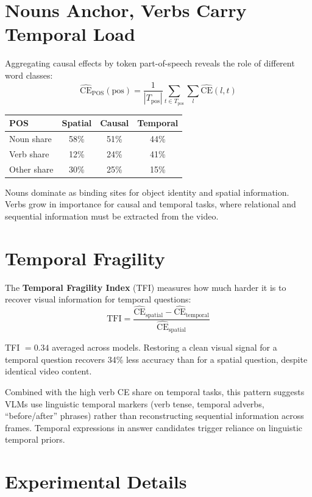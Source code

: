 \documentclass[10pt,twocolumn]{article}
\begin{document}
\section{Nouns Anchor, Verbs Carry Temporal Load}

Aggregating causal effects by token part-of-speech reveals the role
of different word classes:
\[
  \widehat{\text{CE}}_\text{POS}(\text{pos}) =
  \frac{1}{|T_\text{pos}|} \sum_{t \in T_\text{pos}} \sum_l
  \widehat{\text{CE}}(l, t)
\]

\begin{center}
\begin{tabular}{lccc}
\toprule
POS & Spatial & Causal & Temporal \\
\midrule
Noun share  & 58\% & 51\% & 44\% \\
Verb share  & 12\% & 24\% & 41\% \\
Other share & 30\% & 25\% & 15\% \\
\bottomrule
\end{tabular}
\end{center}

Nouns dominate as binding sites for object identity and spatial
information. Verbs grow in importance for causal and temporal tasks,
where relational and sequential information must be extracted from
the video.

\section{Temporal Fragility}

The \textbf{Temporal Fragility Index} (TFI) measures how much harder
it is to recover visual information for temporal questions:
\[
  \text{TFI} =
  \frac{\widehat{\text{CE}}_\text{spatial}
      - \widehat{\text{CE}}_\text{temporal}}
       {\widehat{\text{CE}}_\text{spatial}}
\]

TFI $= 0.34$ averaged across models. Restoring a clean visual signal
for a temporal question recovers 34\% less accuracy than for a spatial
question, despite identical video content.

Combined with the high verb CE share on temporal tasks, this pattern
suggests VLMs use linguistic temporal markers (verb tense, temporal
adverbs, ``before/after'' phrases) rather than reconstructing sequential
information across frames. Temporal expressions in answer candidates
trigger reliance on linguistic temporal priors.

\section{Experimental Details}
\end{document}
